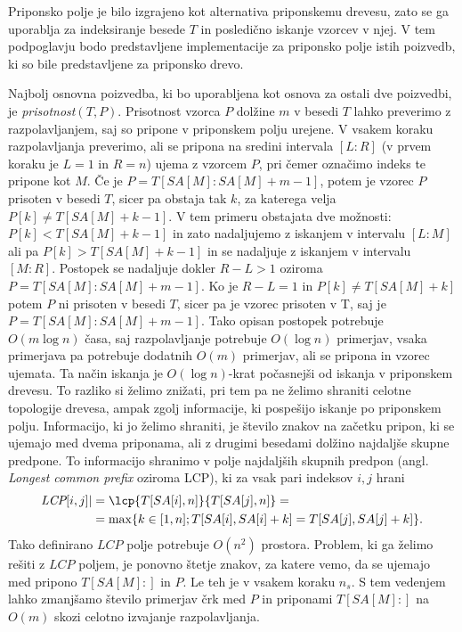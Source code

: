 Priponsko polje je bilo izgrajeno kot alternativa priponskemu drevesu, zato se ga uporablja za indeksiranje besede $T$ in posledično iskanje vzorcev v njej. V tem podpoglavju bodo predstavljene implementacije za priponsko polje istih poizvedb, ki so bile predstavljene za priponsko drevo.

Najbolj osnovna poizvedba, ki bo uporabljena kot osnova za ostali dve poizvedbi, je \textit{prisotnost}$(T,P)$. Prisotnost vzorca $P$ dolžine $m$ v besedi $T$ lahko preverimo z razpolavljanjem, saj so pripone v priponskem polju urejene. V vsakem koraku razpolavljanja preverimo, ali se pripona na sredini intervala $[L:R]$ (v prvem koraku je $L=1$ in $R=n$) ujema z vzorcem $P$, pri čemer označimo indeks te pripone kot $M$. Če je $P=T[SA[M]:SA[M]+m-1]$, potem je vzorec $P$ prisoten v besedi $T$, sicer pa obstaja tak $k$, za katerega velja $P[k]\ne T[SA[M]+k-1]$. V tem primeru obstajata dve možnosti: $P[k]<T[SA[M]+k-1]$ in zato nadaljujemo z iskanjem v intervalu $[L:M]$ ali pa $P[k]>T[SA[M]+k-1]$ in se nadaljuje z iskanjem v intervalu $[M:R]$. Postopek se nadaljuje dokler $R-L>1$ oziroma $P=T[SA[M]:SA[M]+m-1]$. Ko je $R-L=1$ in $P[k]\ne T[SA[M]+k]$ potem $P$ ni prisoten v besedi $T$, sicer pa je vzorec prisoten v T, saj je $P=T[SA[M]:SA[M]+m-1]$. Tako opisan postopek potrebuje $O(m\log{n})$ časa, saj razpolavljanje potrebuje $O(\log{n})$ primerjav, vsaka primerjava pa potrebuje dodatnih $O(m)$ primerjav, ali se pripona in vzorec ujemata. Ta način iskanja je $O(\log{n})$-krat počasnejši od iskanja v priponskem drevesu. To razliko si želimo znižati, pri tem pa ne želimo shraniti celotne topologije drevesa, ampak zgolj informacije, ki pospešijo iskanje po priponskem polju. Informacijo, ki jo želimo shraniti, je število znakov na začetku pripon, ki se ujemajo med dvema priponama, ali z drugimi besedami dolžino najdaljše skupne predpone. To informacijo shranimo v polje najdaljših skupnih predpon (angl. \textit{Longest common prefix} oziroma LCP), ki za vsak pari indeksov $i,j$ hrani
    \begin{equation*} 
        \begin{split}
        \textit{LCP}[i,j]|&=\lcp{T[SA[i],n]}{T[SA[j],n]}=\\
         &=\max\{k\in[1,n];T[SA[i],SA[i]+k]=T[SA[j],SA[j]+k]\}.\\
        \end{split}
    \end{equation*}
Tako definirano $LCP$ polje potrebuje $O(n^2)$ prostora. Problem, ki ga želimo rešiti z $LCP$ poljem, je ponovno štetje znakov, za katere vemo, da se ujemajo med pripono $T[SA[M]:]$ in $P$. Le teh je v vsakem koraku $n_s$. S tem vedenjem lahko zmanjšamo število primerjav črk med $P$ in priponami $T[SA[M]:]$ na $O(m)$ skozi celotno izvajanje razpolavljanja. 


